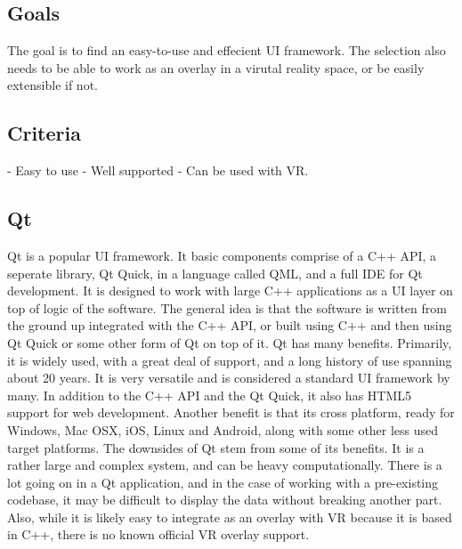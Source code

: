 \documentclass{article}
\begin{document}
\subsection{Goals}
The goal is to find an easy-to-use and effecient UI framework. The selection
also needs to be able to work as an overlay in a virutal reality space, or be
easily extensible if not. 

\subsection{Criteria}
- Easy to use
- Well supported
- Can be used with VR.

\subsection{Qt}
Qt is a popular UI framework. It basic components comprise of a C++ API, a seperate library, Qt Quick,
in a language called QML, and a full IDE for Qt development. It is designed to work with large C++ applications
as a UI layer on top of logic of the software. The general idea is that the software is written from the ground
up integrated with the C++ API, or built using C++ and then using Qt Quick or some other form of Qt on top of 
it. Qt has many benefits. Primarily, it is widely used, with a great deal of support, and a long history of
use spanning about 20 years. It is very versatile and is considered a standard UI framework by many. In
addition to the C++ API and the Qt Quick, it also has HTML5 support for web development. Another benefit
is that its cross platform, ready for Windows, Mac OSX, iOS, Linux and Android, along with some other 
less used target platforms. The downsides of Qt stem from some of its benefits. It is a rather large
and complex system, and can be heavy computationally. There is a lot going on in a Qt application,
and in the case of working with a pre-existing codebase, it may be difficult to display the data
without breaking another part. Also, while it is likely easy to integrate as an overlay with VR
because it is based in C++, there is no known official VR overlay support. \cite{qtsoft}
\end{document}
